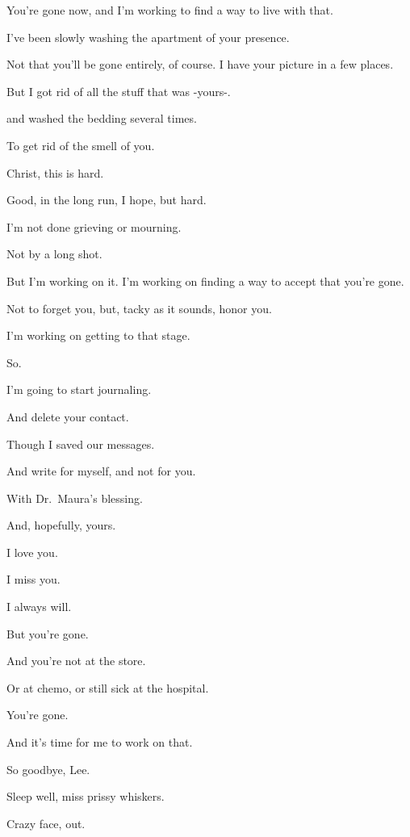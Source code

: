 { You're gone now, and I'm working to find a way to live with that.

 I've been slowly washing the apartment of your presence.

 Not that you'll be gone entirely, of course. I have your picture in a few places.

 But I got rid of all the stuff that was
-yours-.

 and washed the bedding several times.

 To get rid of the smell of you.

 Christ, this is hard.

 Good, in the long run, I hope, but hard.

 I'm not done grieving or mourning.

 Not by a long shot.

 But I'm working on it. I'm working on finding a way to accept that you're gone.

 Not to forget you, but, tacky as it sounds, honor you.

 I'm working on getting to that stage.

 So.

 I'm going to start journaling.

 And delete your contact.

 Though I saved our messages.

 And write for myself, and not for you.

 With Dr.~Maura's blessing.

 And, hopefully, yours.

 I love you.

 I miss you.

 I always will.

 But you're gone.

 And you're not at the store.

 Or at chemo, or still sick at the hospital.

 You're gone.

 And it's time for me to work on that.

 So goodbye, Lee.

 Sleep well, miss prissy whiskers.

 Crazy face, out.

} %
